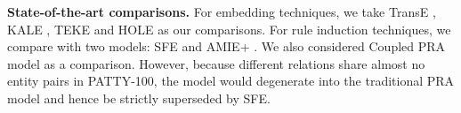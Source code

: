 
\noindent
\textbf{State-of-the-art comparisons.}
For embedding techniques, we take TransE \cite{bordes2013translating},
KALE \cite{guo2016jointly}, TEKE \cite{wang2016text} and
HOLE \cite{nickel2015holographic} as our comparisons.
%
For rule induction techniques, we compare with two models:
SFE \cite{gardner2015efficient} and AMIE+ \cite{galarraga2015fast}.
We also considered Coupled PRA model \cite{wang2016knowledge}
as a comparison. However,
because different relations share almost no entity
pairs in PATTY-100,
the model would degenerate into the traditional PRA model
and hence be strictly superseded by SFE.

